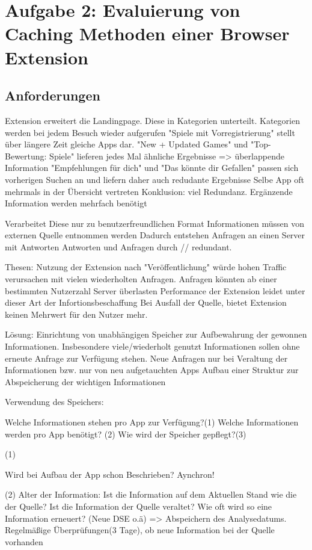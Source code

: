 \section{Aufgabe 2: Evaluierung von Caching Methoden einer Browser Extension}
\label{s:evaluierungcaching}


\subsection{Anforderungen}
\label{ss:anforderungen}
Extension erweitert die Landingpage.
Diese in Kategorien unterteilt. Kategorien werden bei jedem Besuch wieder aufgerufen
"Spiele mit Vorregistrierung" stellt über längere Zeit gleiche Apps dar.
"New + Updated Games" und "Top-Bewertung: Spiele" lieferen jedes Mal ähnliche Ergebnisse => überlappende Information
"Empfehlungen für dich" und "Das könnte dir Gefallen" passen sich vorherigen Suchen an und liefern daher auch redudante Ergebnisse
Selbe App oft mehrmals in der Übersicht vertreten
Konklusion: viel Redundanz. Ergänzende Information werden mehrfach benötigt

Verarbeitet Diese nur zu benutzerfreundlichen Format
Informationen müssen von externen Quelle entnommen werden
Dadurch entstehen Anfragen an einen Server mit Antworten
Antworten und Anfragen durch // redundant.

Thesen:
Nutzung der Extension nach "Veröffentlichung" würde hohen Traffic verursachen mit vielen wiederholten Anfragen.
Anfragen könnten ab einer bestimmten Nutzerzahl Server überlasten
Performance der Extension leidet unter dieser Art der Infortionsbeschaffung
Bei Ausfall der Quelle, bietet Extension keinen Mehrwert für den Nutzer mehr.

Lösung:
Einrichtung von unabhängigen Speicher zur Aufbewahrung der gewonnen Informationen. Insbesondere viele/wiederholt genutzt Informationen sollen ohne erneute Anfrage zur Verfügung stehen.
Neue Anfragen nur bei Veraltung der Informationen bzw. nur von neu aufgetauchten Apps
Aufbau einer Struktur zur Abspeicherung der wichtigen Informationen


Verwendung des Speichers:

Welche Informationen stehen pro App zur Verfügung?(1)
Welche Informationen werden pro App benötigt? (2)
Wie wird der Speicher gepflegt?(3)

(1)

Wird bei Aufbau der App schon Beschrieben?
Aynchron!

(2)
Alter der Information:
Ist die Information auf dem Aktuellen Stand wie die der Quelle?
Ist die Information der Quelle veraltet?
Wie oft wird so eine Information erneuert? (Neue DSE o.ä)
=> Abspeichern des Analysedatums. Regelmäßige Überprüfungen(3 Tage), ob neue Information bei der Quelle vorhanden

